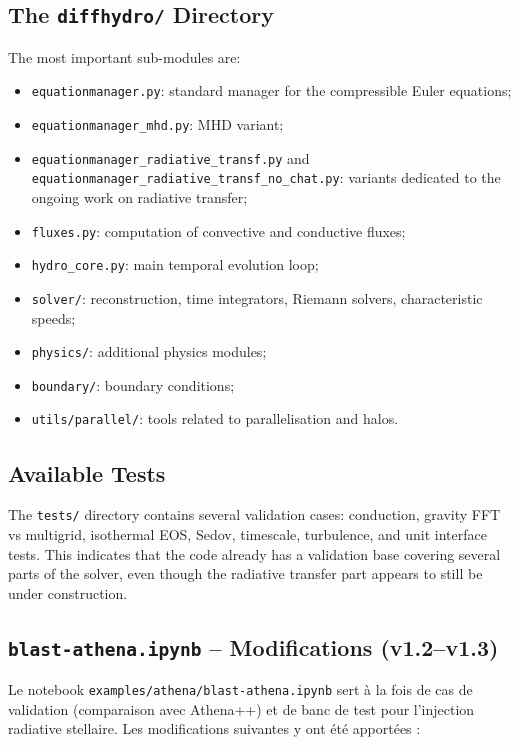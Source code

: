 \documentclass[a4paper, 11pt]{article}
\begin{document}
\subsection{The \texttt{diffhydro/} Directory}
The most important sub-modules are:
\begin{itemize}
    \item \texttt{equationmanager.py}: standard manager for the compressible Euler equations;
    \item \texttt{equationmanager\_mhd.py}: MHD variant;
    \item \texttt{equationmanager\_radiative\_transf.py} and \texttt{equationmanager\_radiative\_transf\_no\_chat.py}: variants dedicated to the ongoing work on radiative transfer;
    \item \texttt{fluxes.py}: computation of convective and conductive fluxes;
    \item \texttt{hydro\_core.py}: main temporal evolution loop;
    \item \texttt{solver/}: reconstruction, time integrators, Riemann solvers, characteristic speeds;
    \item \texttt{physics/}: additional physics modules;
    \item \texttt{boundary/}: boundary conditions;
    \item \texttt{utils/parallel/}: tools related to parallelisation and halos.
\end{itemize}

\subsection{Available Tests}
The \texttt{tests/} directory contains several validation cases: conduction, gravity FFT vs multigrid, isothermal EOS, Sedov, timescale, turbulence, and unit interface tests. This indicates that the code already has a validation base covering several parts of the solver, even though the radiative transfer part appears to still be under construction.

\subsection{\texttt{blast-athena.ipynb} -- Modifications (v1.2--v1.3)}
\label{sec:notebook}

Le notebook \texttt{examples/athena/blast-athena.ipynb} sert à la fois de cas de validation (comparaison avec Athena++) et de banc de test pour l'injection radiative stellaire. Les modifications suivantes y ont été apportées :
\end{document}
